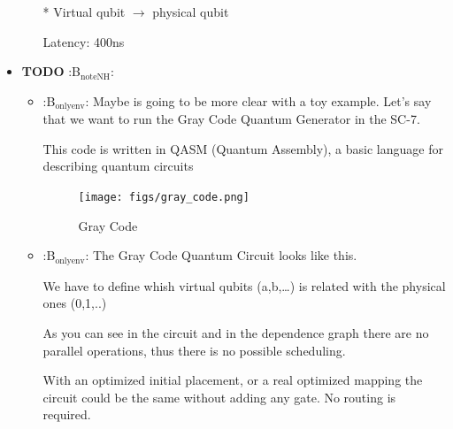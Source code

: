 \begin{itemize}
\begin{itemize}
\tiny{* Virtual qubit $\to$ physical qubit}

Latency: 400ns
\end{itemize}

\item {\bfseries\sffamily TODO} :B\(_{\text{noteNH}}\):
\label{sec:org28a14ec}
\begin{itemize}
\item :B\(_{\text{onlyenv}}\):
\label{sec:org9b312c9}
Maybe is going to be more clear with a toy example.
Let's say that we want to run the Gray Code Quantum Generator in the SC-7.

This code is written in QASM (Quantum Assembly), a basic language for describing quantum circuits

\begin{figure}[htbp]
\centering
\texttt{[image: figs/gray\_code.png]}
\caption{Gray Code}
\end{figure}

\item :B\(_{\text{onlyenv}}\):
\label{sec:org41551a3}
The Gray Code Quantum Circuit looks like this.

We have to define whish virtual qubits (a,b,\ldots{}) is related with the physical ones (0,1,..)

As you can see in the circuit and in the dependence graph there are no parallel operations, thus there is no possible scheduling.

\hline

With an optimized initial placement, or a real optimized mapping the circuit could be the  same without adding any gate.
No routing is required.
\end{itemize}
\end{itemize}

